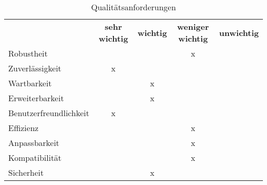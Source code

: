 \begin{table}[h]
	\centering
	\begin{tabularx}{\textwidth}{l c c c c}
		\rowcolor[HTML]{C0C0C0} 
		& \textbf{sehr wichtig} & \textbf{wichtig} & \textbf{weniger wichtig} & \textbf{unwichtig} \\
		Robustheit &  &  & x &  \\
		\rowcolor[HTML]{E7E7E7} 
		Zuverlässigkeit & x &  &  &  \\
		Wartbarkeit &  & x &  &  \\
		\rowcolor[HTML]{E7E7E7} 
		Erweiterbarkeit &  & x &  &  \\
		Benutzerfreundlichkeit & x &  &  &  \\
		\rowcolor[HTML]{E7E7E7} 
		Effizienz &  &  & x &  \\
		Anpassbarkeit &  &  & x &  \\
		\rowcolor[HTML]{E7E7E7} 
		Kompatibilität &  &  & x &  \\
		Sicherheit &  & x &  & 
	\end{tabularx}
	\caption{Qualitätsanforderungen}
	\label{tabelle:qualitaetsanforderungen}
\end{table}